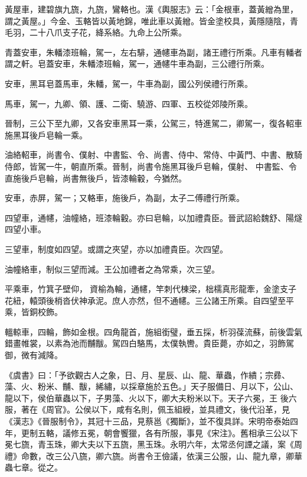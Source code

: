 \begin{pinyinscope}
 黃屋車，建碧旗九旒，九旒，鸞輅也。漢《輿服志》云：「金根車，蓋黃繒為里，謂之黃屋。」今金、玉輅皆以黃地錦，唯此車以黃繒。皆金塗校具，黃隱隨陰，青毛羽，二十八爪支子花，絳系絡。九命上公所乘。



 青蓋安車，朱轓漆班輪，駕一，左右騑，通幰車為副，諸王禮行所乘。凡車有轓者謂之軒。皂蓋安車，朱轓漆班輪，駕一，通幰牛車為副，三公禮行所乘。



 安車，黑耳皂蓋馬車，朱轓，駕一，牛車為副，國公列侯禮行所乘。



 馬車，駕一，九卿、領、護、二衛、驍游、四軍、五校從郊陵所乘。



 晉制，三公下至九卿，又各安車黑耳一乘，公駕三，特進駕二，卿駕一，復各軺車施黑耳後戶皂輪一乘。



 油絡軺車，尚書令、僕射、中書監、令、尚書、侍中、常侍、中黃門、中書、散騎侍郎，皆駕一牛，朝直所乘。晉制，尚書令施黑耳後戶皂輪，僕射、
 中書監、令直施後戶皂輪，尚書無後戶，皆漆輪轂，今猶然。



 安車，赤屏，駕一；又輅車，施後戶，為副，太子二傅禮行所乘。



 四望車，通幰，油幢絡，班漆輪轂。亦曰皂輪，以加禮貴臣。晉武詔給魏舒、陽燧四望小車。



 三望車，制度如四望。或謂之夾望，亦以加禮貴臣。次四望。



 油幢絡車，制似三望而減。王公加禮者之為常乘，次三望。



 平乘車，竹箕子壁仰，資榆為輪，通幰，竿刺代棟梁，柮檽真形龍牽，金塗支子花紐，轅頭後梢沓伏神承泥。庶人亦然，但不通幰。三公諸王所乘。自四望至平乘，皆銅校飾。



 轀輬車，四輪，飾如金根。四角龍首，施組銜璧，垂五採，析羽葆流蘇，前後雲氣錯畫帷裳，以素為池而黼黻。駕四白駱馬，太僕執轡。貴臣薨，亦如之，羽飾駕御，微有減降。



 《虞書》曰：「予欲觀古人之象，日、月、星辰、山、龍、華蟲，作繢；宗彞、藻、火、粉米、黼、黻，絺繡，以採章施於五色。」天子服備日、月以下，公山、龍以下，侯伯華蟲以下，子男藻、火以下，卿大夫粉米以下。天子六冕，王
 後六服，著在《周官》。公侯以下，咸有名則，佩玉組綬，並具禮文，後代沿革，見《漢志》《晉服制令》，其冠十三品，見蔡邕《獨斷》，並不復具詳。宋明帝泰始四年，更制五輅，議修五冕，朝會饗獵，各有所服，事見《宋注》。舊相承三公以下冕七旒，青玉珠，卿大夫以下五旒，黑玉珠。永明六年，太常丞何諲之議，案《周禮》命數，改三公八旒，卿六旒。尚書令王儉議，依漢三公服，山、龍九章，卿華蟲七章。從之。




\end{pinyinscope}

